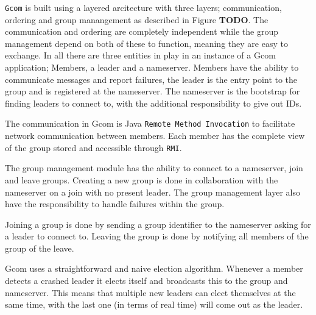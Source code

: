	\texttt{Gcom} is built using a layered arcitecture with three layers; communication, ordering and group manangement as described in Figure \textbf{TODO}.
	The communication and ordering are completely independent while the group management depend on both of these to function, meaning they are easy to exchange.
	In all there are three entities in play in an instance of a Gcom application; Members, a leader and a nameserver.
	Members have the ability to communicate messages and report failures, the leader is the entry point to the group and is registered at the nameserver.
	The nameserver is the bootstrap for finding leaders to connect to, with the additional responsibility to give out IDs.

	The communication in Gcom is Java \texttt{Remote Method Invocation} to facilitate network communication between members.
	Each member has the complete view of the group stored and accessible through \texttt{RMI}.








	




	The group management module has the ability to connect to a nameserver, join and leave groups.
	Creating a new group is done in collaboration with the nameserver on a join with no present leader.
	The group management layer also have the responsibility to handle failures within the group.


	Joining a group is done by sending a group identifier to the nameserver asking for a leader to connect to.
	Leaving the group is done by notifying all members of the group of the leave.


		Gcom uses a straightforward and naive election algorithm.
		Whenever a member detects a crashed leader it elects itself and broadcasts this to the group and nameserver.
		This means that multiple new leaders can elect themselves at the same time, with the last one (in terms of real time) will come out as the leader.


